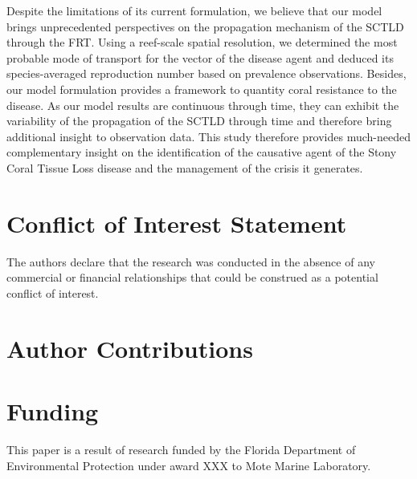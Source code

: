 \documentclass[utf8]{frontiersSCNS}
\begin{document}
Despite the limitations of its current formulation, we believe that our model brings unprecedented perspectives on the propagation mechanism of the SCTLD through the FRT. Using a reef-scale spatial resolution, we determined the most probable mode of transport for the vector of the disease agent and deduced its species-averaged reproduction number based on prevalence observations. Besides, our model formulation provides a framework to quantity coral resistance to the disease. As our model results are continuous through time, they can exhibit the variability of the propagation of the SCTLD through time and therefore bring additional insight to observation data. This study therefore provides much-needed complementary insight on the identification of the causative agent of the Stony Coral Tissue Loss disease and the management of the crisis it generates.

% 

\section*{Conflict of Interest Statement}
The authors declare that the research was conducted in the absence of any commercial or financial relationships that could be construed as a potential conflict of interest.

\section*{Author Contributions}
  
\section*{Funding}
This paper is a result of research funded by the Florida Department of Environmental Protection under award XXX to Mote Marine Laboratory. 
\end{document}
